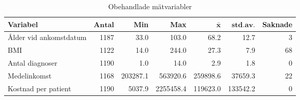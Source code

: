 \begin{table}[htbp]
\centering
\caption{Obehandlade mätvariabler}
\label{tab:raw1}    
{\footnotesize
\begin{tabular}{lrrrrrr}
 \textbf{Variabel} & $\mathbf{Antal}$ & \textbf{Min} & \textbf{Max} & $\mathbf{\bar{x}}$ & $\mathbf{std.av.}$ & \textbf{Saknade} \\ 
  \hline
Ålder vid ankomstdatum & 1187 &     33.0 &     103.0 &     68.2 &     12.7 &  3 \\ 
  BMI & 1122 &     14.0 &     244.0 &     27.3 &      7.9 & 68 \\ 
  Antal diagnoser & 1190 &      1.0 &      14.0 &      2.9 &      1.8 &  0 \\ 
  Medelinkomst & 1168 & 203287.1 &  563920.6 & 259898.6 &  37659.3 & 22 \\ 
  Kostnad per patient & 1190 &   5037.9 & 2255458.4 & 119623.0 & 133542.2 &  0 \\ 
  \end{tabular}
}
\end{table}

